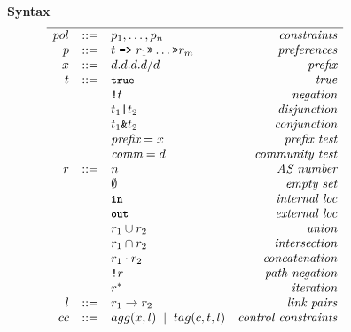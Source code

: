 \documentclass[10pt]{sigalternate052015}
\newcommand{\CD}[1]{\texttt{\small #1}}  %
\newcommand{\KW}[1]{\texttt{\small\bfseries{#1}}}
\newcommand{\True}{\CD{true}}
\newcommand{\Prefer}{\texttt{>>}}
\newcommand{\Path}{\texttt{=>}}
\newcommand{\In}{\KW{in}}
\newcommand{\Out}{\KW{out}}
\newcommand{\AND}{\texttt{\&}}
\newcommand{\OR}{\texttt{|}}
\newcommand{\NOT}{\texttt{!}}
\begin{document}
\newcommand{\BNFALT}{\;\;|\;\;}
\newcommand{\hdr}[2]{\flushleft \chdr{\hspace{5mm}#1}{#2}}
\newcommand{\chdr}[2]{\textbf{#1} {#2} \\ \centering}

\begin{figure}[t]\small
  \begin{minipage}[t]{.45\linewidth}
  \hdr{Syntax}{}
  \vspace*{-1\baselineskip}
  \[ \begin{array}{rclr}
    \hline

     pol     &::=& p_1, \dots, p_n & \textit{constraints} \\
     p       &::=& t \hspace{.3em} \Path \hspace{.3em} r_1 \Prefer \dots \Prefer r_m & \textit{preferences} \\
     x       &::=& d.d.d.d/d & \textit{prefix} \\
     t       &::=& \True & \textit{true} \\
         &\BNFALT& \NOT t & \textit{negation} \\
         &\BNFALT& t_1 \OR{} t_2 & \textit{disjunction} \\
         &\BNFALT& t_1 \AND{} t_2 & \textit{conjunction} \\
         &\BNFALT& \textit{prefix} = x & \textit{prefix test} \\
         &\BNFALT& \textit{comm} = d & \textit{community test} \\
     r       &::=& n & \textit{AS number} \\
         &\BNFALT& \emptyset & \textit{empty set} \\
         &\BNFALT& \In & \textit{internal loc} \\
         &\BNFALT& \Out & \textit{external loc} \\
         &\BNFALT& r_1 \cup r_2 & \textit{union} \\
         &\BNFALT& r_1 \cap r_2 & \textit{intersection} \\
         &\BNFALT& r_1 \cdot r_2 & \textit{concatenation} \\
         &\BNFALT& \NOT r & \textit{path negation} \\
         &\BNFALT& r^* & \textit{iteration} \\
     l       &::=& r_1 \rightarrow r_2 & \textit{link pairs} \\
     cc     &::=& agg(x, l) \BNFALT tag(c, t, l) & \textit{control constraints} \\
  \end{array} \]


\end{minipage}
\end{figure}
\end{document}
